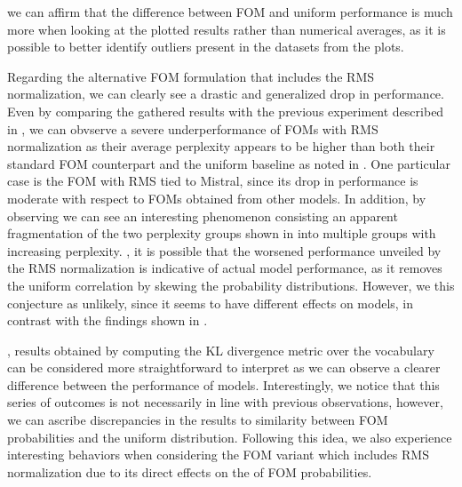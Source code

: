  we can affirm that the difference between FOM and uniform performance is much more  when looking at the plotted results rather than numerical averages, as it is possible to better identify outliers present in the datasets from the plots.


Regarding the alternative FOM formulation that includes the RMS normalization, we can clearly see a drastic and generalized drop in performance.
Even by comparing the gathered results with the previous experiment described in , we can obvserve a severe underperformance of FOMs with RMS normalization as their average perplexity appears to be  higher than both their standard FOM counterpart and the uniform baseline as noted in .
One particular case is the FOM with RMS tied to Mistral, since its drop in performance is moderate with respect to FOMs obtained from other models.
In addition, by observing  we can see an interesting phenomenon consisting  an apparent fragmentation of the two perplexity groups shown in  into multiple groups with increasing perplexity.
, it is possible that the worsened performance unveiled by the RMS normalization is indicative of actual model performance, as it removes the uniform correlation by skewing the probability distributions.
However, we  this conjecture as unlikely, since it seems to have different effects on models, in contrast with the findings shown in .

, results obtained by computing the KL divergence metric over the vocabulary can be considered more straightforward to interpret as we can observe  a clearer difference between the performance of models.
Interestingly, we notice that this series of outcomes is not necessarily in line with previous observations, however, we can ascribe discrepancies in the results to  similarity between FOM probabilities and the uniform distribution.
Following this idea, we also experience interesting behaviors when considering the FOM variant which includes RMS normalization due to its direct effects on the  of FOM probabilities.

